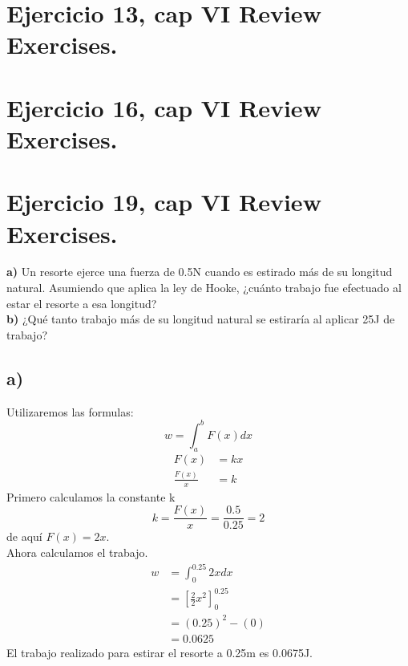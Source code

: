 \documentclass[11pt,letterpaper]{article}
\begin{document}
\section{Ejercicio 13, cap VI Review Exercises.}

\section{Ejercicio 16, cap VI Review Exercises.}

\section{Ejercicio 19, cap VI Review Exercises.}
\textbf{a)} Un resorte ejerce una fuerza de 0.5N cuando es estirado más de su longitud natural.
Asumiendo que aplica la ley de Hooke, ¿cuánto trabajo fue efectuado al estar el resorte a esa longitud?\\
\textbf{b)} ¿Qué tanto trabajo más de su longitud natural se estiraría al aplicar 25J de trabajo?
\subsection*{a)}
Utilizaremos las formulas:\\
\begin{equation*}
  w=\int_{a}^{b}F(x)dx
\end{equation*}
\begin{equation*}
  \begin{split}
    F(x) &= kx\\
    \frac{F(x)}{x} &= k
  \end{split}
\end{equation*}
Primero calculamos la constante k
\begin{equation*}
  k=\frac{F(x)}{x}=\frac{0.5}{0.25}=2
\end{equation*}
de aquí $F(x)=2x$.\\
Ahora calculamos el trabajo.
\begin{equation*}
  \begin{split}
    w &= \int_{0}^{0.25}2xdx\\
    &= \left[ \frac{2}{2}x^2\right]^{0.25}_{0}\\
    &=(0.25)^2-(0)\\
    &=0.0625
  \end{split}
\end{equation*}
El trabajo realizado para estirar el resorte a 0.25m es 0.0675J.
\end{document}
